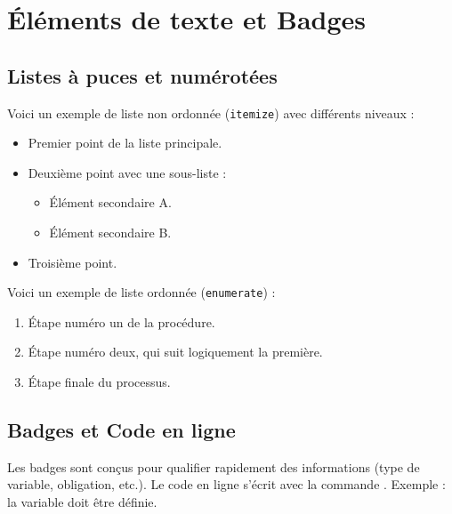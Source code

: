 \section{Éléments de texte et Badges}

\subsection{Listes à puces et numérotées}

Voici un exemple de liste non ordonnée (\texttt{itemize}) avec différents niveaux :
\begin{itemize}
    \item Premier point de la liste principale.
    \item Deuxième point avec une sous-liste :
    \begin{itemize}
        \item Élément secondaire A.
        \item Élément secondaire B.
    \end{itemize}
    \item Troisième point.
\end{itemize}

Voici un exemple de liste ordonnée (\texttt{enumerate}) :
\begin{enumerate}
    \item Étape numéro un de la procédure.
    \item Étape numéro deux, qui suit logiquement la première.
    \item Étape finale du processus.
\end{enumerate}

\subsection{Badges et Code en ligne}

Les badges sont conçus pour qualifier rapidement des informations (type de variable, obligation, etc.).
Le code en ligne s'écrit avec la commande . Exemple : la variable  doit être définie.

